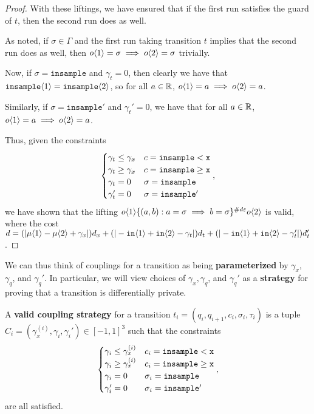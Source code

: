 \begin{proof}
With these liftings, we have ensured that if the first run satisfies the guard of $t$, then the second run does as well. 

As noted, if $\sigma \in \Gamma$ and the first run taking transition $t$ implies that the second run does as well, then $o\brangle{1} = \sigma \implies o\brangle{2}=\sigma$ trivially.

Now, if $\sigma=\texttt{insample}$ and $\gamma_t=0$, then clearly we have that $\texttt{insample}\brangle{1}=\texttt{insample}\brangle{2}$, so for all $a\in \RR$, $o\brangle{1} = a\implies o\brangle{2} = a$.

Similarly, if $\sigma=\texttt{insample}'$ and $\gamma_t'=0$, we have that for all $a\in \RR$, $o\brangle{1} = a\implies o\brangle{2} = a$.

Thus, given the constraints \[
  \begin{cases}
    \gamma_t\leq\gamma_x & c = \lguard[\texttt{x}]\\
    \gamma_t\geq\gamma_x & c = \gguard[\texttt{x}]\\
    \gamma_t=0 & \sigma = \texttt{insample}\\
    \gamma_t'=0 & \sigma = \texttt{insample}'
  \end{cases},
\]
we have shown that the lifting $o\brangle{1}\{(a, b): a=\sigma\implies b=\sigma\}^{\#d\varepsilon}o\brangle{2}$ is valid, where the cost $d = (|\mu\brangle{1}-\mu\brangle{2}+\gamma_x|)d_x+(|-\texttt{in}\brangle{1}+\texttt{in}\brangle{2}-\gamma_t|)d_t+(|-\texttt{in}\brangle{1}+\texttt{in}\brangle{2}-\gamma_t'|)d_t'$. 

\end{proof}

We can thus think of couplings for a transition as being \textbf{parameterized} by $\gamma_x$, $\gamma_q$, and $\gamma_q'$. In particular, we will view choices of $\gamma_x, \gamma_q$, and $\gamma_q'$ as a \textbf{strategy} for proving that a transition is differentially private. 


\begin{defn}
    A \textbf{valid coupling strategy} for a transition $t_i = (q_i, q_{i+1}, c_i, \sigma_i, \tau_i)$ is a tuple $C_i = (\gamma_x^{(i)}, \gamma_i, \gamma_i')\in [-1, 1]^3$ such that the constraints \[
        \begin{cases}
          \gamma_i\leq\gamma_x^{(i)} & c_i = \lguard[\texttt{x}]\\
          \gamma_i\geq\gamma_x^{(i)} & c_i = \gguard[\texttt{x}]\\
          \gamma_i=0 & \sigma_i = \texttt{insample}\\
          \gamma_i'=0 & \sigma_i = \texttt{insample}'
        \end{cases},
      \]
      are all satisfied. 
\end{defn}